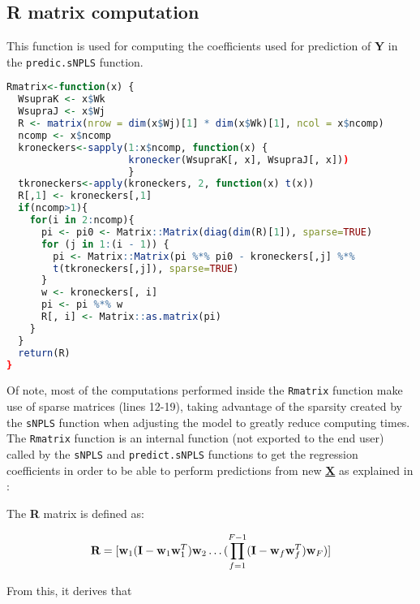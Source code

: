 \subsection{R matrix computation}
\label{rmatrixf}
This function is used for computing the coefficients used for prediction of \textbf{Y} in the \texttt{predic.sNPLS} function.
\vspace{15pt}
\begin{scriptsize}
\begin{lstlisting}[language=R, deletekeywords={scale, !=, <-, !, Q, qf, names, max, var}, otherkeywords={}, morekeywords={unfold3w}, caption=R matrix function]
Rmatrix<-function(x) {
  WsupraK <- x$Wk
  WsupraJ <- x$Wj
  R <- matrix(nrow = dim(x$Wj)[1] * dim(x$Wk)[1], ncol = x$ncomp)
  ncomp <- x$ncomp
  kroneckers<-sapply(1:x$ncomp, function(x) {
                     kronecker(WsupraK[, x], WsupraJ[, x]))
                     }
  tkroneckers<-apply(kroneckers, 2, function(x) t(x))
  R[,1] <- kroneckers[,1]
  if(ncomp>1){
    for(i in 2:ncomp){
      pi <- pi0 <- Matrix::Matrix(diag(dim(R)[1]), sparse=TRUE)
      for (j in 1:(i - 1)) {
        pi <- Matrix::Matrix(pi %*% pi0 - kroneckers[,j] %*% 
        t(tkroneckers[,j]), sparse=TRUE)
      }
      w <- kroneckers[, i]
      pi <- pi %*% w
      R[, i] <- Matrix::as.matrix(pi)
    }
  }
  return(R)
}
\end{lstlisting}
\end{scriptsize}

Of note, most of the computations performed inside the \texttt{Rmatrix} function make use of sparse matrices (lines 12-19), taking advantage of the sparsity created by the \texttt{sNPLS} function when adjusting the model to greatly reduce computing times. The \texttt{Rmatrix} function is an internal function (not exported to the end user) called by the \texttt{sNPLS} and \texttt{predict.sNPLS} functions to get the regression coefficients in order to be able to perform predictions from new \textbf{\underline{X}} as explained in \textcite{leardi2005multi}:

The \textbf{R} matrix is defined as:

\begin{equation}
    \textbf{\text{R}}=[\textbf{\text{w}}_1(\textbf{\text{I}}-\textbf{\text{w}}_1\textbf{\text{w}}^T_1)\textbf{\text{w}}_2 \dots (\prod_{f=1}^{F-1}(\textbf{\text{I}}-\textbf{\text{w}}_f\textbf{\text{w}}^T_f)\textbf{\text{w}}_F)]
\end{equation}

From this, it derives that


